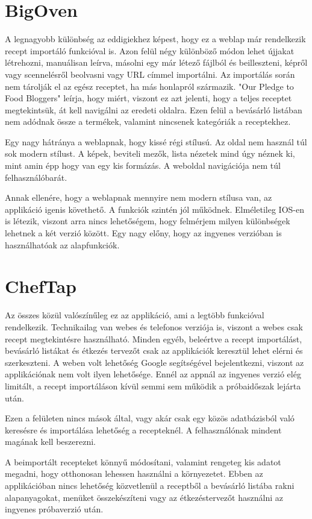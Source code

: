 \documentclass[12pt]{report}
\theoremstyle{definition}
\begin{document}
\section{BigOven}
A legnagyobb különbség az eddigiekhez képest, hogy ez a weblap már rendelkezik recept importáló funkcióval is. Azon felül négy különböző módon lehet újjakat létrehozni, manuálisan leírva, másolni egy már létező fájlból és beilleszteni, képről vagy scennelésről beolvasni vagy URL címmel importálni. Az importálás során nem tárolják el az egész receptet, ha más honlapról származik. "Our Pledge to Food Bloggers" leírja, hogy miért, viszont ez azt jelenti, hogy a teljes receptet megtekintsük, át kell navigálni az eredeti oldalra. Ezen felül a bevásárló listában nem adódnak össze a termékek, valamint nincsenek kategóriák a receptekhez.

Egy nagy hátránya a weblapnak, hogy kissé régi stílusú. Az oldal nem használ túl sok modern stílust. A képek, beviteli mezők, lista nézetek mind úgy néznek ki, mint amin épp hogy van egy kis formázás. A weboldal navigációja nem túl  felhasználóbarát. 

Annak ellenére, hogy a weblapnak mennyire nem modern stílusa van, az applikáció igenis követhető. A funkciók szintén jól működnek. Elméletileg IOS-en is létezik, viszont arra nincs lehetőségem, hogy felmérjem milyen különbségek lehetnek a két verzió között. Egy nagy előny, hogy az ingyenes verzióban is használhatóak az alapfunkciók. 


\section{ChefTap}
Az összes közül valószínűleg ez az applikáció, ami a legtöbb funkcióval rendelkezik. Technikailag van webes és telefonos verziója is, viszont a webes csak recept megtekintésre használható. Minden egyéb, beleértve a recept importálást, bevásárló listákat és étkezés tervezőt csak az applikációk keresztül lehet elérni és szerkeszteni. A weben volt lehetőség Google segítségével bejelentkezni, viszont az applikációnak nem volt ilyen lehetősége. Ennél az appnál az ingyenes verzió elég limitált, a recept importáláson kívül semmi sem működik a próbaidőszak lejárta után.

Ezen a felületen nincs mások által, vagy akár csak egy közös adatbázisból való keresésre és importálása lehetőség a recepteknél. A felhasználónak mindent magának kell beszerezni. 

A beimportált recepteket könnyű módosítani, valamint rengeteg kis adatot megadni, hogy otthonosan lehessen használni a környezetet. Ebben az applikációban nincs lehetőség közvetlenül a receptből a bevásárló listába rakni alapanyagokat, menüket összekészíteni vagy az étkezéstervezőt használni az ingyenes próbaverzió után.
\end{document}
